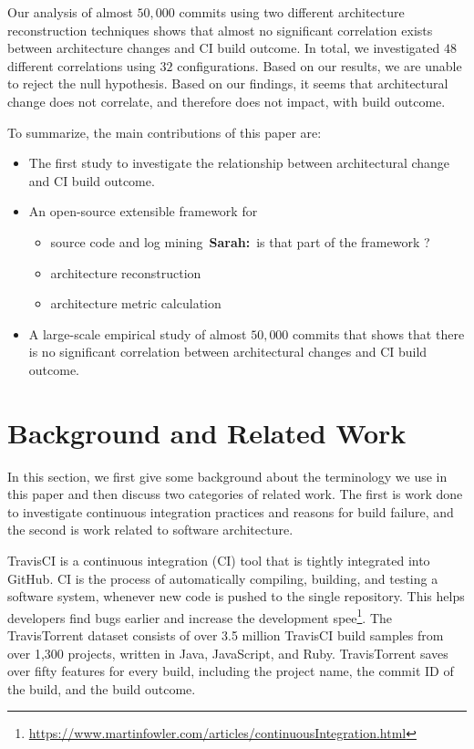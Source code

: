 \documentclass[sigplan, anonymous, review]{acmart}
\newcommand{\sn}[1]{{\color{blue}\textbf{Sarah:}~#1}}
\begin{document}
Our analysis of almost $50,000$ commits using two different architecture reconstruction techniques shows that almost no significant correlation exists between architecture changes and CI build outcome. In total, we investigated $48$ different correlations using $32$ configurations. Based on our results, we are unable to reject the null hypothesis. Based on our findings, it seems that architectural change does not correlate, and therefore does not impact, with build outcome.

To summarize, the main contributions of this paper are:
\begin{itemize}
\item The first study to investigate the relationship between architectural change and CI build outcome.
\item An open-source extensible framework for 
\begin{itemize}
	\item source code and log mining~\sn{is that part of the framework ?}
	\item architecture reconstruction
	\item architecture metric calculation
\end{itemize}
\item A large-scale empirical study of almost $50,000$ commits that shows that there is no significant correlation between architectural changes and CI build outcome.
\end{itemize}


\section{Background and Related Work}

In this section, we first give some background about the terminology we use in this paper and then discuss two categories of related work. The first is work done to investigate continuous integration practices and reasons for build failure, and the second is work related to software architecture.

TravisCI is a continuous integration (CI) tool that is tightly integrated into GitHub. CI is the process of automatically compiling, building, and testing a software system, whenever new code is pushed to the single repository. This helps developers find bugs earlier and increase the development spee\footnote{\url{https://www.martinfowler.com/articles/continuousIntegration.html}}. 
The TravisTorrent dataset \cite{TravisTorrent} consists of over 3.5 million TravisCI build samples from over 1,300 projects, written in Java, JavaScript, and Ruby.
TravisTorrent saves over fifty features for every build, including the project name, the commit ID of the build, and the build outcome.
\end{document}
